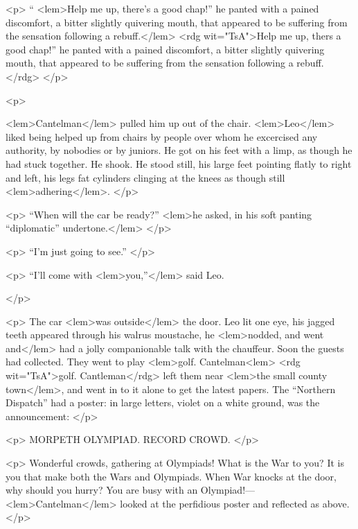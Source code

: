 				<p>
				“
<lem>Help me up, there's a good chap!” he panted with a pained discomfort, a bitter slightly quivering mouth, that appeared to be suffering from the sensation following a rebuff.</lem>
<rdg wit="TsA">Help me up, thers a good chap!” he panted with a pained discomfort, a
bitter slightly quivering mouth, that appeared to be suffering from the
sensation following a rebuff.</rdg>
					{}
 				</p>

				<p>
					
<lem>Cantelman</lem>
						{} 
					pulled him up out of the chair. 
<lem>Leo</lem>
						{} 
					liked being helped up from chairs by 
					people over whom he excercised any authority, by nobodies or by juniors. He got on 
					his feet with a limp, as though he had stuck together. He shook. He stood still, his 
					large feet pointing flatly to right and left, his legs fat cylinders clinging at 
					the knees as though still 
<lem>adhering</lem>{}. 
 				</p>

				<p>
					“When will the car be ready?” 
<lem>he asked, in his soft panting “diplomatic” undertone.</lem>
						{} 
 				</p>

				<p>
					“I'm just going to see.” 
 				</p>

				<p>
				“I'll come with 
<lem>you,”</lem>{} said Leo. 
					
				</p> 

				<p>
					The car 
<lem>was outside</lem>{} the door. Leo lit one eye, his jagged teeth appeared through 
					his walrus moustache, he 
<lem>nodded, and went and</lem>
						{} 
					had a jolly companionable talk with 
					the chauffeur. Soon the guests had collected. They went to play 
<lem>golf. Cantelman<lem>
<rdg wit="TsA">golf. Cantleman</rdg>
						{} 
					left 
					them near 
<lem>the small county town</lem>{}, and went in to it alone to get the latest papers. The “Northern 
					Dispatch” had a poster: in large letters, violet on a white ground, was the announcement: 
 				</p>

				<p>
					\vspace{10pt}
					\Large{MORPETH OLYMPIAD. RECORD CROWD.}
				</p>

				<p>
					\vspace{10pt}
					Wonderful crowds, gathering at Olympiads! What is the War to you? It is you that make 
					both the Wars and Olympiads. When War knocks at the door, why should you hurry? You 
					are busy with an Olympiad!---
<lem>Cantelman</lem>{} looked at the perfidious poster and reflected as 
					above. 
 				</p>

